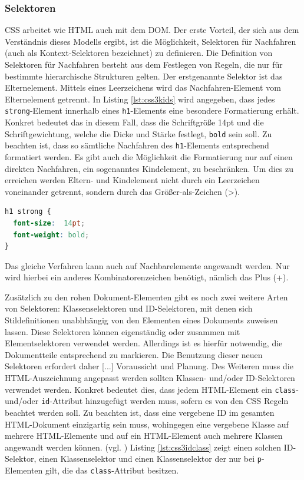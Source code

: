 \subsubsection{Selektoren} CSS arbeitet wie HTML auch mit dem DOM. \glqq Der erste Vorteil, der sich aus dem Verständnis dieses Modells ergibt, ist die Möglichkeit, Selektoren für Nachfahren (auch als Kontext-Selektoren bezeichnet) zu definieren. Die Definition von Selektoren für Nachfahren besteht aus dem Festlegen von Regeln, die nur für bestimmte hierarchische Strukturen gelten.\grqq{}\cite[S.48]{MeyeCasc2005} Der erstgenannte Selektor ist das Elternelement. Mittels eines Leerzeichens wird das Nachfahren-Element vom Elternelement getrennt. In Listing \ref{lst:css3kids} wird angegeben, dass jedes \texttt{strong}-Element innerhalb eines \texttt{h1}-Elements eine besondere Formatierung erhält. Konkret bedeutet das in diesem Fall, dass die Schriftgröße 14pt und die Schriftgewichtung, welche die Dicke und Stärke festlegt, \texttt{bold} sein soll. Zu beachten ist, dass so sämtliche Nachfahren des \texttt{h1}-Elements entsprechend formatiert werden. Es gibt auch die Möglichkeit die Formatierung nur auf einen direkten Nachfahren, ein sogenanntes Kindelement, zu beschränken. Um dies zu erreichen werden Eltern- und Kindelement nicht durch ein Leerzeichen voneinander getrennt, sondern durch das Größer-als-Zeichen (\textgreater).

\vspace{1em}
\begin{lstlisting}[language=CSS, caption=CSS3 Selektoren für Nachfahren, label=lst:css3kids]
h1 strong {
  font-size:  14pt;
  font-weight: bold;  
}
\end{lstlisting}

Das gleiche Verfahren kann auch auf Nachbarelemente angewandt werden. Nur wird hierbei ein anderes Kombinatorenzeichen benötigt, nämlich das Plus (+).\par \glqq Zusätzlich zu den rohen Dokument-Elementen gibt es noch zwei weitere Arten von Selektoren: Klassenselektoren und ID-Selektoren, mit denen sich Stildefinitionen unabhhängig von den Elementen eines Dokuments zuweisen lassen. Diese Selektoren können eigenständig oder zusammen mit Elementselektoren verwendet werden. Allerdings ist es hierfür notwendig, die Dokumentteile entsprechend zu markieren. Die Benutzung dieser neuen Selektoren erfordert daher [...] Voraussicht und Planung.\grqq{}\cite[S.34ff]{MeyeCasc2005} Des Weiteren muss die HTML-Auszeichnung angepasst werden sollten Klassen- und/oder ID-Selektoren verwendet werden. Konkret bedeutet dies, dass jedem HTML-Element ein \texttt{class}- und/oder \texttt{id}-Attribut hinzugefügt werden muss, sofern es von den CSS Regeln beachtet werden soll. Zu beachten ist, dass eine vergebene ID im gesamten HTML-Dokument einzigartig sein muss, wohingegen eine vergebene Klasse auf mehrere HTML-Elemente und auf ein HTML-Element auch mehrere Klassen angewandt werden können. (vgl. \cite{W3ScCss2014}) Listing \ref{lst:css3idclass} zeigt einen solchen ID-Selektor, einen Klassenselektor und einen Klassenselektor der nur bei \texttt{p}-Elementen gilt, die das \texttt{class}-Attribut besitzen.

